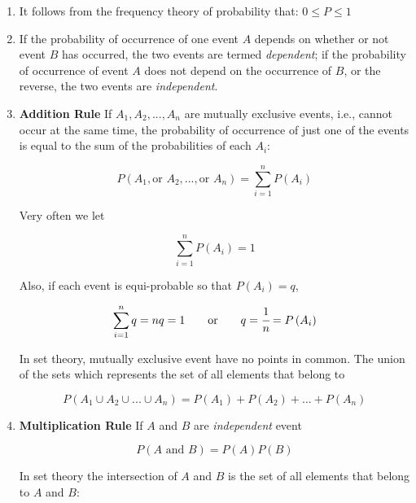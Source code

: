 \documentclass[a4paper,fleqn]{cas-dc}
\begin{document}
\begin{enumerate}
	\item It follows from the frequency theory of probability that: $0 \leq P \leq 1$
	\item If the probability of occurrence of one event $A$ depends on whether or not event $B$ has occurred, the two events are termed \textit{dependent}; if the probability of occurrence of event $A$ does not depend on the occurrence of $B$, or the reverse, the two events are \textit{independent}.
	\item \textbf{Addition Rule}
	If $A_1,A_2,...,A_n$ are mutually exclusive events, i.e., cannot occur at the same time, the probability of occurrence of just one of the events is equal to the sum of the probabilities of each $A_i$:
	
	{\footnotesize
	\begin{equation}
		P\left( A_1, \text{or~} A_2,..., \text{or~} A_n \right) = \sum_{i=1}^{n} P\left( A_i \right)
	\end{equation} }

	Very often we let
	
	{\footnotesize
	\begin{equation}
		\sum_{i=1}^{n} P\left( A_i \right) = 1
	\end{equation} }
	
	Also, if each event is equi-probable so that $P(A_i) = q$,
	
	{\footnotesize
	\begin{equation}
		\sum_{i=1}^{n} q = nq = 1 \qquad \text{or} \qquad  q=\cfrac{1}{n} = P\left( A_i \right)
	\end{equation} }
	
	In set theory, mutually exclusive event have no points in common. The union of the sets which represents the set of all elements that belong to
	
	{\footnotesize
	\begin{equation}
		P\left( A_1 \cup A_2 \cup ... \cup A_n \right) = P(A_1) + P(A_2) + ... + P(A_n)
	\end{equation} }

	\item \textbf{Multiplication Rule}
	If $A$ and $B$ are \textit{independent} event
	
	{\footnotesize
	\begin{equation}
		P\left( A \text{~and~} B\right) = P(A)P(B)
	\end{equation} }
	
	In set theory the intersection of $A$ and $B$ is the set of all elements that belong to $A$ and $B$:


\end{enumerate}
\end{document}
